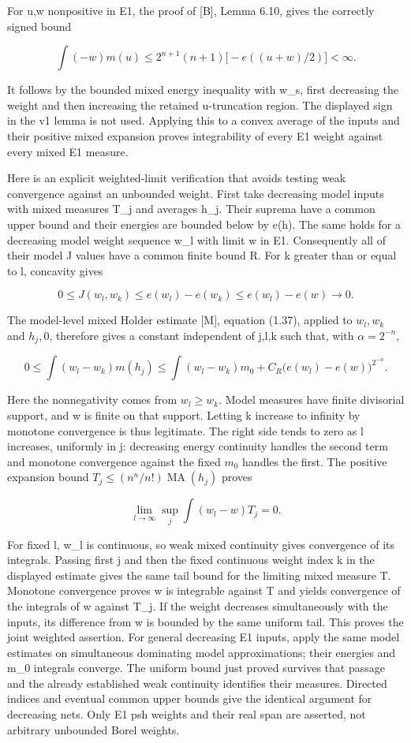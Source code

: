 \documentclass[11pt]{article}
\newcommand{\MA}{\operatorname{MA}}
\begin{document}
For u,w nonpositive in E1, the proof of [B], Lemma 6.10, gives the correctly signed bound

\[
\int(-w)m(u)
\leq 2^{n+1}(n+1)\bigl[-e((u+w)/2)\bigr]<\infty.
\]

It follows by the bounded mixed energy inequality with w\_s, first decreasing the weight and then increasing the retained u-truncation region. The displayed sign in the v1 lemma is not used. Applying this to a convex average of the inputs and their positive mixed expansion proves integrability of every E1 weight against every mixed E1 measure.

Here is an explicit weighted-limit verification that avoids testing weak convergence against an unbounded weight. First take decreasing model inputs with mixed measures T\_j and averages h\_j. Their suprema have a common upper bound and their energies are bounded below by e(h). The same holds for a decreasing model weight sequence w\_l with limit w in E1. Consequently all of their model J values have a common finite bound R. For k greater than or equal to l, concavity gives

\[
0\leq J(w_l,w_k)\leq e(w_l)-e(w_k)\leq e(w_l)-e(w)\longrightarrow0.
\]

The model-level mixed Holder estimate [M], equation (1.37), applied to \(w_l,w_k\) and \(h_j,0\), therefore gives a constant independent of j,l,k such that, with \(\alpha=2^{-n}\),

\[
0\leq\int(w_l-w_k)m(h_j)
\leq\int(w_l-w_k)m_0+
C_R\bigl(e(w_l)-e(w)\bigr)^{2^{-n}}.
\]

Here the nonnegativity comes from \(w_l\geq w_k\). Model measures have finite divisorial support, and w is finite on that support. Letting k increase to infinity by monotone convergence is thus legitimate. The right side tends to zero as l increases, uniformly in j: decreasing energy continuity handles the second term and monotone convergence against the fixed \(m_0\) handles the first. The positive expansion bound \(T_j\leq(n^n/n!)\MA(h_j)\) proves

\[
\lim_{l\to\infty}\sup_j\int(w_l-w)T_j=0.
\]

For fixed l, w\_l is continuous, so weak mixed continuity gives convergence of its integrals. Passing first j and then the fixed continuous weight index k in the displayed estimate gives the same tail bound for the limiting mixed measure T. Monotone convergence proves w is integrable against T and yields convergence of the integrals of w against T\_j. If the weight decreases simultaneously with the inputs, its difference from w is bounded by the same uniform tail. This proves the joint weighted assertion. For general decreasing E1 inputs, apply the same model estimates on simultaneous dominating model approximations; their energies and m\_0 integrals converge. The uniform bound just proved survives that passage and the already established weak continuity identifies their measures. Directed indices and eventual common upper bounds give the identical argument for decreasing nets. Only E1 psh weights and their real span are asserted, not arbitrary unbounded Borel weights.
\end{document}
